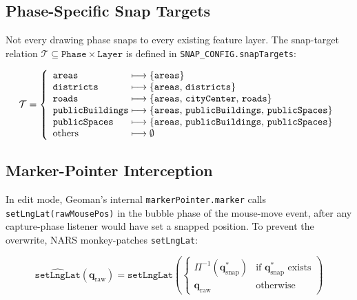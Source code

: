 \documentclass[12pt,a4paper]{article}
\theoremstyle{definition}
\theoremstyle{plain}
\theoremstyle{remark}
\newcommand{\vect}[1]{\mathbf{#1}}
\begin{document}
\subsection{Phase-Specific Snap Targets}

Not every drawing phase snaps to every existing feature layer. The
snap-target relation $\mathcal{T} \subseteq \texttt{Phase} \times
\texttt{Layer}$ is defined in \texttt{SNAP\_CONFIG.snapTargets}:

\begin{equation}
  \mathcal{T} = \left\{
  \begin{array}{l@{\;\longmapsto\;}l}
    \texttt{areas}         & \{\texttt{areas}\}                          \\
    \texttt{districts}     & \{\texttt{areas},\, \texttt{districts}\}    \\
    \texttt{roads}         & \{\texttt{areas},\, \texttt{cityCenter},\, \texttt{roads}\} \\
    \texttt{publicBuildings} & \{\texttt{areas},\, \texttt{publicBuildings},\, \texttt{publicSpaces}\} \\
    \texttt{publicSpaces}  & \{\texttt{areas},\, \texttt{publicBuildings},\, \texttt{publicSpaces}\} \\
    \text{others}          & \emptyset
  \end{array}
  \right.
  \label{eq:snap_targets}
\end{equation}

\subsection{Marker-Pointer Interception}

In edit mode, Geoman's internal \texttt{markerPointer.marker} calls
\texttt{setLngLat(rawMousePos)} in the bubble phase of the mouse-move
event, after any capture-phase listener would have set a snapped position.
To prevent the overwrite, NARS monkey-patches \texttt{setLngLat}:

\begin{equation}
  \widehat{\texttt{setLngLat}}(\vect{q}_{\text{raw}}) =
  \texttt{setLngLat}\!\left(
    \begin{cases}
      \Pi^{-1}(\vect{q}^*_{\text{snap}}) & \text{if } \vect{q}^*_{\text{snap}} \text{ exists} \\
      \vect{q}_{\text{raw}}              & \text{otherwise}
    \end{cases}
  \right)
  \label{eq:marker_patch}
\end{equation}
\end{document}
